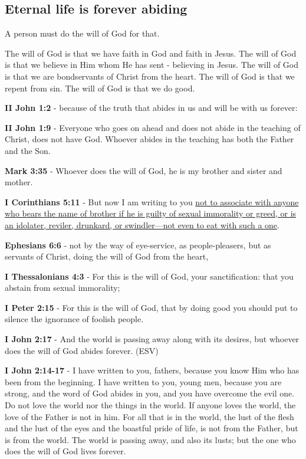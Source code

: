 \documentclass[11pt]{article}
\begin{document}
\subsection{Eternal life is forever abiding}
\label{sec:org5ff66cd}
A person must do the will of God for that.

The will of God is that we have faith in God and faith in Jesus.
The will of God is that we believe in Him whom He has sent - believing in Jesus.
The will of God is that we are bondservants of Christ from the heart.
The will of God is that we repent from sin.
The will of God is that we do good.

\textbf{II John 1:2} - because of the truth that abides in us and will be with us forever:

\textbf{II John 1:9} - Everyone who goes on ahead and does not abide in the teaching of Christ, does not have God. Whoever abides in the teaching has both the Father and the Son.

\textbf{Mark 3:35} - Whoever does the will of God, he is my brother and sister and mother.

\textbf{I Corinthians 5:11} - But now I am writing to you \uline{not to associate with anyone who bears the name of brother if he is guilty of sexual immorality or greed, or is an idolater, reviler, drunkard, or swindler—not even to eat with such a one}.

\textbf{Ephesians 6:6} - not by the way of eye-service, as people-pleasers, but as servants of Christ, doing the will of God from the heart,

\textbf{I Thessalonians 4:3} - For this is the will of God, your sanctification: that you abstain from sexual immorality;

\textbf{I Peter 2:15} - For this is the will of God, that by doing good you should put to silence the ignorance of foolish people.

\textbf{I John 2:17} - And the world is passing away along with its desires, but whoever does the will of God abides forever. (ESV)

\textbf{I John 2:14-17} - I have written to you, fathers, because you know Him who has been from the beginning. I have written to you, young men, because you are strong, and the word of God abides in you, and you have overcome the evil one.  Do not love the world nor the things in the world. If anyone loves the world, the love of the Father is not in him.  For all that is in the world, the lust of the flesh and the lust of the eyes and the boastful pride of life, is not from the Father, but is from the world.  The world is passing away, and also its lusts; but the one who does the will of God lives forever.
\end{document}
